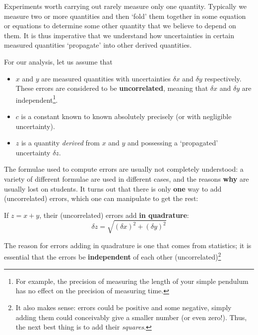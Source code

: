 Experiments worth carrying out rarely measure only one quantity. Typically we measure two or more quantities and then `fold' them together in some equation or equations to determine some other quantity that we believe to depend on them. It is thus imperative that we understand how uncertainties in certain measured quantities `propagate' into other derived quantities.

For our analysis, let us assume that

\begin{itemize}
    \item $x$ and $y$ are measured quantities with uncertainties $\delta x$ and $\delta y$ respectively. These errors are considered to be \textbf{uncorrelated}, meaning that $\delta x$ and $\delta y$ are independent\footnote{For example, the precision of measuring the length of your simple pendulum has no effect on the precision of measuring time.}.
    
    \item $c$ is a constant known to known absolutely precisely (or with negligible uncertainty).
    
    \item $z$ is a quantity \textit{derived} from $x$ and $y$ and possessing a `propagated' uncertainty $\delta z$.
\end{itemize}

The formulae used to compute errors are usually not completely understood: a variety of different formulae are used in different cases, and the reasons \textbf{why} are usually lost on students. It turns out that there is only \textbf{one} way to add (uncorrelated) errors, which one can manipulate to get the rest:

\begin{imp}
If $z = x + y$, their (uncorrelated) errors add \textbf{in quadrature}:
\begin{equation}
    \delta z = \sqrt{\left(\delta x\right)^2+\left(\delta y\right)^2}
    \label{quadrature}
\end{equation}
\end{imp}

The reason for errors adding in quadrature is one that comes from statistics; it is essential that the errors be \textbf{independent} of each other (uncorrelated)\footnote{It also makes sense:  errors could be positive and some negative, simply adding them could conceivably give a smaller number (or even zero!). Thus, the next best thing is to add their \textit{squares}. }

